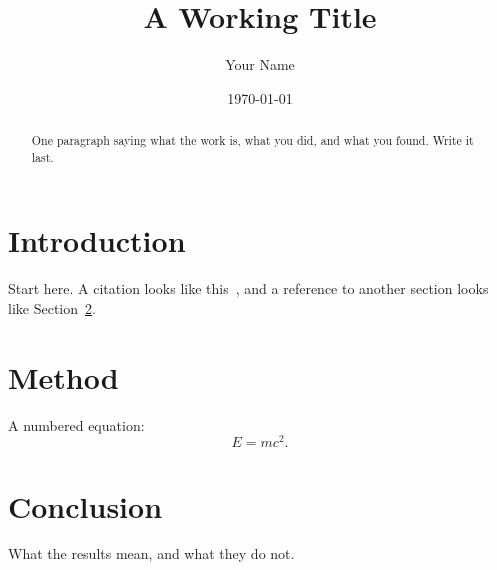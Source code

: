 \documentclass[aps,prl,reprint,amsmath,amssymb]{revtex4-2}
\begin{document}
\title{A Working Title}

\author{Your Name}

\date{\today}

\begin{abstract}
One paragraph saying what the work is, what you did, and what you found.
Write it last.
\end{abstract}

\maketitle

\section{Introduction}
\label{sec:introduction}

Start here.  A citation looks like this~\cite{knuth1984}, and a reference to
another section looks like Section~\ref{sec:method}.

\section{Method}
\label{sec:method}

A numbered equation:
\begin{equation}
  \label{eq:example}
  E = mc^2.
\end{equation}

\section{Conclusion}

What the results mean, and what they do not.


\end{document}
